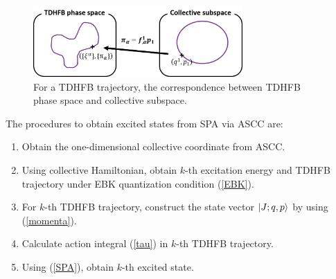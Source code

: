\documentclass[%
superscriptaddress,
showpacs,
nofootinbib,
amsmath,amssymb,
aps,
prc,
twocolumn,
floatfix ]%
{revtex4-1}
\begin{document}
\begin{figure}[htbp]
 \begin{center}
    \includegraphics[width=80mm, bb=0 0 550 180]{SPA.png}
 \end{center}
  \caption{For a TDHFB trajectory, the correspondence between TDHFB phase space and collective subspace.}
  \label{correspondence}
\end{figure}

The procedures to obtain excited states from SPA via ASCC are:
\begin{enumerate}
\item Obtain the one-dimensional collective coordinate from ASCC.
\item Using collective Hamiltonian, obtain $k$-th excitation energy and TDHFB trajectory under EBK quantization condition (\ref{EBK}).
\item For $k$-th TDHFB trajectory, construct the state vector $\ket{J;q,p}$ by using (\ref{momenta}).
\item Calculate action integral (\ref{tau}) in $k$-th TDHFB trajectory.
\item Using (\ref{SPA}), obtain $k$-th excited state.
\end{enumerate}
\end{document}
